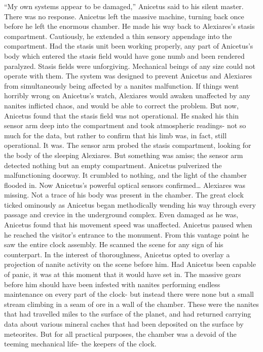 \documentclass[a4paper]{article}
\begin{document}
“My own systems appear to be damaged,” Anicetus said to his silent master. There was no response. Anicetus left the massive machine, turning back once before he left the enormous chamber.
He made his way back to Alexiares’s stasis compartment. Cautiously, he extended a thin sensory appendage into the compartment. Had the stasis unit been working properly, any part of Anicetus’s body which entered the stasis field would have gone numb and been rendered paralyzed.
Stasis fields were unforgiving. Mechanical beings of any size could not operate with them. The system was designed to prevent Anicetus and Alexiares from simultaneously being affected by a nanites malfunction. If things went horribly wrong on Anicetus’s watch, Alexiares would awaken unaffected by any nanites inflicted chaos, and would be able to correct the problem.
But now, Anicetus found that the stasis field was not operational. He snaked his thin sensor arm deep into the compartment and took atmospheric readings- not so much for the data, but rather to confirm that his limb was, in fact, still operational. It was.
The sensor arm probed the stasis compartment, looking for the body of the sleeping Alexiares. But something was amiss; the sensor arm detected nothing but an empty compartment.
Anicetus pulverized the malfunctioning doorway. It crumbled to nothing, and the light of the chamber flooded in. Now Anicetus’s powerful optical sensors confirmed… Alexiares was missing. Not a trace of his body was present in the chamber.
The great clock ticked ominously as Anicetus began methodically wending his way through every passage and crevice in the underground complex. Even damaged as he was, Anicetus found that his movement speed was unaffected.
Anicetus paused when he reached the visitor’s entrance to the monument. From this vantage point he saw the entire clock assembly. He scanned the scene for any sign of his counterpart. In the interest of thoroughness, Anicetus opted to overlay a projection of nanite activity on the scene before him. Had Anicetus been capable of panic, it was at this moment that it would have set in.
The massive gears before him should have been infested with nanites performing endless maintenance on every part of the clock- but instead there were none but a small stream climbing in a seam of ore in a wall of the chamber. These were the nanites that had travelled miles to the surface of the planet, and had returned carrying data about various mineral caches that had been deposited on the surface by meteorites. But for all practical purposes, the chamber was a devoid of the teeming mechanical life- the keepers of the clock.
\end{document}
